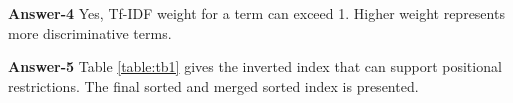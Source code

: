 \documentclass[10pt,onecolumn,letterpaper]{article}
\begin{document}
\vspace{12pt}

\noindent\textbf{Answer-4}
Yes, Tf-IDF weight for a term can exceed 1. Higher weight represents more discriminative terms.


\vspace{12pt}
\noindent\textbf{Answer-5}
Table \ref{table:tb1} gives the inverted index that can support positional restrictions. The final sorted and merged sorted index is presented.


\end{document}
